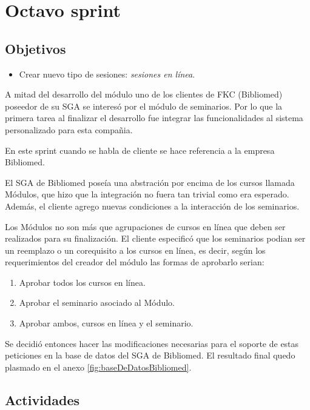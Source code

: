 \section{Octavo sprint} %
\label{sec:octavo_sprint}

\subsection{Objetivos}

\begin{itemize}
	\item Crear nuevo tipo de sesiones: \emph{sesiones en línea}.
\end{itemize}

A mitad del desarrollo del módulo uno de los clientes de FKC (Bibliomed) poseedor de su SGA se interesó por el módulo de seminarios. Por lo que la primera tarea al finalizar el desarrollo fue integrar las funcionalidades al sistema personalizado para esta compañia.

En este sprint cuando se habla de cliente se hace referencia a la empresa Bibliomed.

El SGA de Bibliomed poseía una abstración por encima de los cursos llamada Módulos, que hizo que la integración no fuera tan trivial como era esperado. Además, el cliente agrego nuevas condiciones a la interacción de los seminarios.

Los Módulos no son más que agrupaciones de cursos en línea que deben ser realizados para su finalización. El cliente especificó que los seminarios podian ser un reemplazo o un corequisito a los cursos en línea, es decir, según los requerimientos del creador del módulo las formas de aprobarlo serian:

\begin{enumerate}
	\item Aprobar todos los cursos en línea.
	\item Aprobar el seminario asociado al Módulo.
	\item Aprobar ambos, cursos en línea y el seminario.
\end{enumerate}

Se decidió entonces hacer las modificaciones necesarias para el soporte de estas peticiones en la base de datos del SGA de Bibliomed. El resultado final quedo plasmado en el anexo \ref{fig:baseDeDatosBibliomed}.

\subsection{Actividades} %
\label{sub:actividades8}

